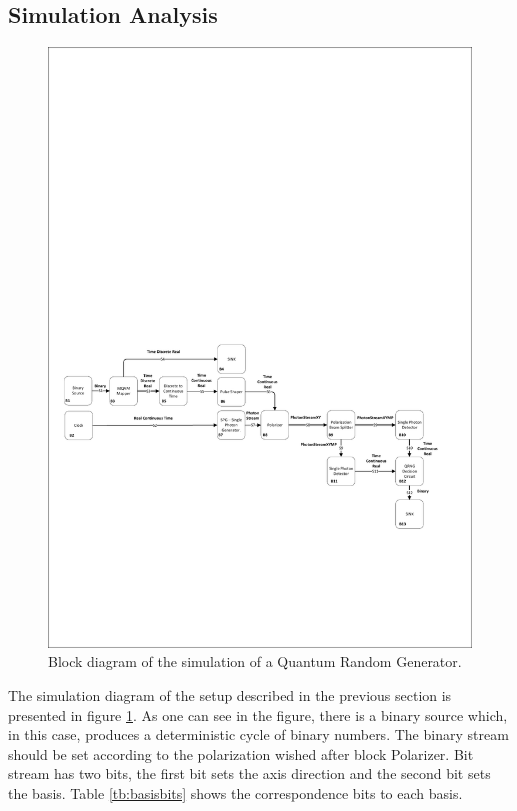 \subsection{Simulation Analysis}

\begin{figure}[h]
    \centering
        \includegraphics[clip, trim=0.5cm 5cm 0.5cm 14cm, width=1.00\textwidth]{./sdf/quantum_random_number_generator/figures_raw/Simulation_qrng.pdf}
    \caption{Block diagram of the simulation of a Quantum Random Generator.}\label{sim_qrng}
\end{figure}

The simulation diagram of the setup described in the previous section is presented in figure \ref{sim_qrng}. As one can see in the figure, there is a binary source which, in this case, produces a deterministic cycle of binary numbers. The binary stream should be set according to the polarization wished after block Polarizer. Bit stream has two bits, the first bit sets the axis direction and the second bit sets the basis. Table \ref{tb:basisbits} shows the correspondence bits to each basis.

